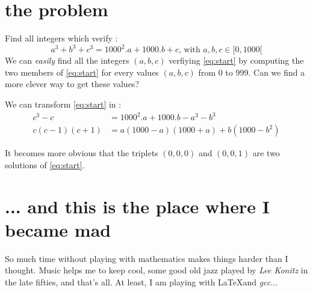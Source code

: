 
\section{the problem}
Find all integers which verify :
\begin{equation}\label{eq:start}
	a^3 + b^3 + c^3 = 1000^2.a + 1000.b + c \text{, with } a, b, c \in [0, 1000[
\end{equation}
We can \emph{easily} find all the integers $(a, b, c)$ verfiying \eqref{eq:start} by computing the two members of \eqref{eq:start} for every values $(a, b, c)$ from 0 to 999. Can we find a more clever way to get these values?

We can transform \eqref{eq:start} in :
\begin{equation}\label{eq:second}
\begin{split}
	c^3 - c &= 1000^2.a + 1000.b - a^3 - b^3 \\
	c(c - 1)(c + 1) &= a(1000 - a)(1000 + a) + b(1000 - b^2)
 \end{split}
\end{equation}

It becomes more obvious that the triplets $(0, 0, 0)$ and $(0, 0, 1)$ are two solutions of \eqref{eq:start}.

\section{... and this is the place where I became mad}
So much time without playing with mathematics makes things harder than I thought. Music helps me to keep cool, some good old jazz played by \emph{Lee Konitz} in the late fifties, and that's all. At least, I am playing with \LaTeX and \emph{gcc}...
